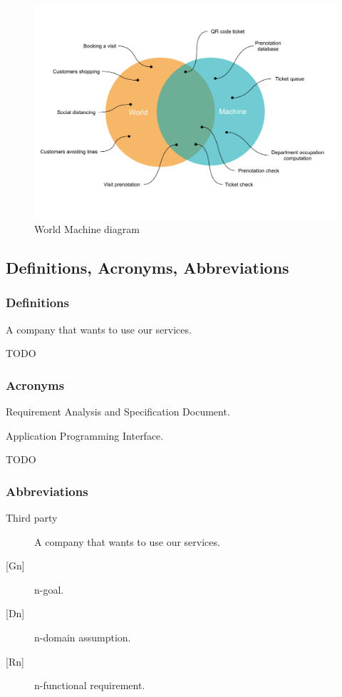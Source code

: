 \begin{figure}[h]
    \centering
    \includegraphics[width=.85\textwidth]{Images/world-machine.pdf}
    \caption{\label{fig:world_machine} World Machine diagram}
\end{figure}


\subsection{Definitions, Acronyms, Abbreviations}
\subsubsection{Definitions}
\begin{description}
    \item [Third party company] A company that wants to use our services.
    {\todo
        \item \huge TODO
    }
\end{description}
\subsubsection{Acronyms}
\begin{description}
    \item [RASD] Requirement Analysis and Specification Document. 
    \item [API] Application Programming Interface.
    {\todo
        \item \huge TODO
    }
\end{description}
\subsubsection{Abbreviations}
\begin{description}
    \item [Third party] A company that wants to use our services.
    \item [{[Gn]}] n-goal. 
    \item [{[Dn]}] n-domain assumption. 
    \item [{[Rn]}] n-functional requirement. 
\end{description}

